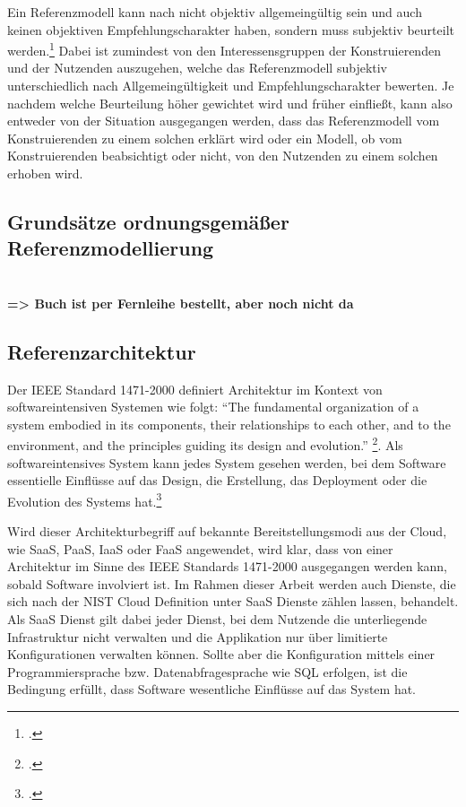 Ein Referenzmodell kann nach \citeauthor{vomBrocke.2003} nicht objektiv allgemeingültig sein und auch keinen objektiven Empfehlungscharakter haben, sondern muss subjektiv beurteilt werden.\footcite[Vgl. auch im Folgenden][31~f.]{vomBrocke.2003}  Dabei ist zumindest von den Interessensgruppen der Konstruierenden und der Nutzenden auszugehen, welche das Referenzmodell subjektiv unterschiedlich nach Allgemeingültigkeit und Empfehlungscharakter bewerten. Je nachdem welche Beurteilung höher gewichtet wird und früher einfließt, kann also entweder von der Situation ausgegangen werden, dass das Referenzmodell vom Konstruierenden zu einem solchen erklärt wird oder ein Modell, ob vom Konstruierenden beabsichtigt oder nicht, von den Nutzenden zu einem solchen erhoben wird.

\subsection{Grundsätze ordnungsgemäßer Referenzmodellierung}
 \\
\textbf{=> Buch ist per Fernleihe bestellt, aber noch nicht da}


\subsection{Referenzarchitektur}
Der IEEE Standard 1471-2000 definiert Architektur im Kontext von softwareintensiven Systemen wie folgt:
\enquote{The fundamental organization of a system embodied in its components, their relationships
to each other, and to the environment, and the principles guiding its design and evolution.} \footcite[][3]{IEEEComputerSociety.2000}. Als softwareintensives System kann jedes System gesehen werden, bei dem Software essentielle Einflüsse auf das Design, die Erstellung, das Deployment oder die Evolution des Systems hat.\footcite[Vgl.][1]{IEEEComputerSociety.2000}

Wird dieser Architekturbegriff auf bekannte Bereitstellungsmodi aus der Cloud, wie \ac{SaaS}, \ac{PaaS}, \ac{IaaS} oder \ac{FaaS} angewendet, wird klar, dass von einer Architektur im Sinne des IEEE Standards 1471-2000 ausgegangen werden kann, sobald Software involviert ist. Im Rahmen dieser Arbeit werden auch Dienste, die sich nach der NIST Cloud Definition unter \ac{SaaS} Dienste zählen lassen, behandelt. Als \ac{SaaS} Dienst gilt dabei jeder Dienst, bei dem Nutzende die unterliegende Infrastruktur nicht verwalten und die Applikation nur über limitierte Konfigurationen verwalten können. Sollte aber die Konfiguration mittels einer Programmiersprache bzw. Datenabfragesprache wie \ac{SQL} erfolgen, ist die Bedingung erfüllt, dass Software wesentliche Einflüsse auf das System hat.


